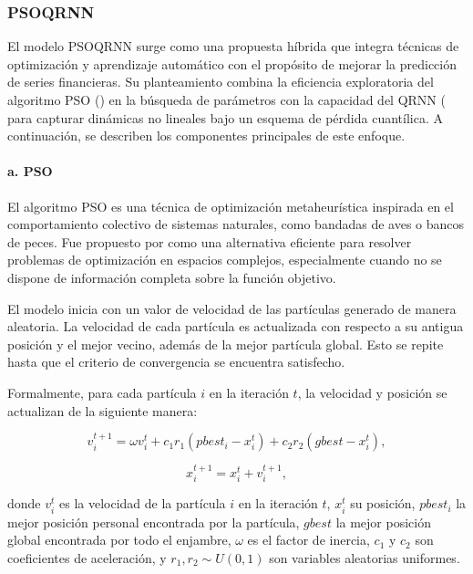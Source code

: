 \documentclass[12pt]{paper}
\begin{document}
\subsubsection[PSOQRNN]{PSOQRNN}

El modelo PSOQRNN surge como una propuesta híbrida que integra técnicas de optimización y aprendizaje automático con el propósito de mejorar la predicción de series financieras. Su planteamiento combina la eficiencia exploratoria del algoritmo PSO (\cite{kennedy1995}) en la búsqueda de parámetros con la capacidad del QRNN (\cite{taylor2000qrnn} para capturar dinámicas no lineales bajo un esquema de pérdida cuantílica. A continuación, se describen los componentes principales de este enfoque.

\paragraph{a. PSO}
El algoritmo PSO es una técnica de optimización metaheurística inspirada en el comportamiento colectivo de sistemas naturales, como bandadas de aves o bancos de peces. Fue propuesto por \cite{kennedy1995} como una alternativa eficiente para resolver problemas de optimización en espacios complejos, especialmente cuando no se dispone de información completa sobre la función objetivo.

El modelo inicia con un valor de velocidad de las partículas generado de manera aleatoria. La velocidad de cada partícula es actualizada con respecto a su antigua posición y el mejor vecino, además de la mejor partícula global. Esto se repite hasta que el criterio de convergencia se encuentra satisfecho.

Formalmente, para cada partícula $i$ en la iteración $t$, la velocidad y posición se actualizan de la siguiente manera:

\begin{equation}
v_i^{t+1} = \omega v_i^{t} + c_1 r_1 (pbest_i - x_i^{t}) + c_2 r_2 (gbest - x_i^{t}),
\end{equation}

\begin{equation}
x_i^{t+1} = x_i^{t} + v_i^{t+1},
\end{equation}

donde $v_i^{t}$ es la velocidad de la partícula $i$ en la iteración $t$, $x_i^{t}$ su posición, $pbest_i$ la mejor posición personal encontrada por la partícula, $gbest$ la mejor posición global encontrada por todo el enjambre, $\omega$ es el factor de inercia, $c_1$ y $c_2$ son coeficientes de aceleración, y $r_1, r_2 \sim U(0,1)$ son variables aleatorias uniformes.
\end{document}
